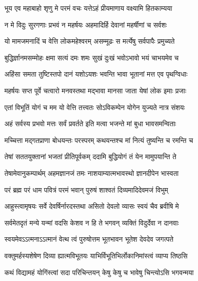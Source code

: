 \twolineshloka
{भूय एव महाबाहो शृणु मे परमं वचः}
{यत्तेऽहं प्रीयमाणाय वक्ष्यामि हितकाम्यया}%

\twolineshloka
{न मे विदुः सुरगणाः प्रभवं न महर्षयः}
{अहमादिर्हि देवानां महर्षीणां च सर्वशः}%

\twolineshloka
{यो मामजमनादिं च वेत्ति लोकमहेश्वरम्}
{असम्मूढः स मर्त्येषु सर्वपापैः प्रमुच्यते}%

\twolineshloka
{बुद्धिर्ज्ञानमसम्मोहः क्षमा सत्यं दमः शमः}
{सुखं दुःखं भवोऽभावो भयं चाभयमेव च}%

\twolineshloka
{अहिंसा समता तुष्टिस्तपो दानं यशोऽयशः}
{भवन्ति भावा भूतानां मत्त एव पृथग्विधाः}%

\twolineshloka
{महर्षयः सप्त पूर्वे चत्वारो मनवस्तथा}
{मद्भावा मानसा जाता येषां लोक इमाः प्रजाः}%

\twolineshloka
{एतां विभूतिं योगं च मम यो वेत्ति तत्त्वतः}
{सोऽविकम्पेन योगेन युज्यते नात्र संशयः}%

\twolineshloka
{अहं सर्वस्य प्रभवो मत्तः सर्वं प्रवर्तते}
{इति मत्वा भजन्ते मां बुधा भावसमन्विताः}%

\twolineshloka
{मच्चित्ता मद्गतप्राणा बोधयन्तः परस्परम्}
{कथयन्तश्च मां नित्यं तुष्यन्ति च रमन्ति च}%

\twolineshloka
{तेषां सततयुक्तानां भजतां प्रीतिपूर्वकम्}
{ददामि बुद्धियोगं तं येन मामुपयान्ति ते}%

\twolineshloka
{तेषामेवानुकम्पार्थम् अहमज्ञानजं तमः}
{नाशयाम्यात्मभावस्थो ज्ञानदीपेन भास्वता}%

\twolineshloka
{परं ब्रह्म परं धाम पवित्रं परमं भवान्}
{पुरुषं शाश्वतं दिव्यमादिदेवमजं विभुम्}%

\twolineshloka
{आहुस्त्वामृषयः सर्वे देवर्षिर्नारदस्तथा}
{असितो देवलो व्यासः स्वयं चैव ब्रवीषि मे}%

\twolineshloka
{सर्वमेतदृतं मन्ये यन्मां वदसि केशव}
{न हि ते भगवन् व्यक्तिं विदुर्देवा न दानवाः}%

\twolineshloka
{स्वयमेवऽऽत्मनाऽऽत्मानं वेत्थ त्वं पुरुषोत्तम}
{भूतभावन भूतेश देवदेव जगत्पते}%

\twolineshloka
{वक्तुमर्हस्यशेषेण दिव्या ह्यात्मविभूतयः}
{याभिर्विभूतिभिर्लोकानिमांस्त्वं व्याप्य तिष्ठसि}%

\twolineshloka
{कथं विद्यामहं योगिंस्त्वां सदा परिचिन्तयन्}
{केषु केषु च भावेषु चिन्त्योऽसि भगवन्मया}%

